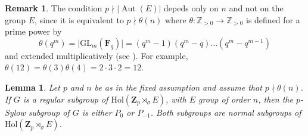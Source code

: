 \documentclass[12pt]{article}
\newtheorem{lemma}[theorem]{Lemma}
\theoremstyle{definition}
\newtheorem{remark}[theorem]{Remark}
\newcommand{\Z}{\mathbf Z}
\newcommand{\F}{\mathbf F}
\newcommand{\Hol}{\mathrm{Hol}}
\newcommand{\GL}{\mathrm{GL}}
\newcommand{\Aut}{\operatorname{Aut}}
\begin{document}
\begin{remark} The condition $p\nmid |\Aut(E)|$ depeds only on $n$ and not on the group $E$, since it is equivalent to $p\nmid \theta(n)$ where 
	$\theta\colon\mathbb{Z}_{>0}\longrightarrow\mathbb{Z}_{>0}$ is defined for a prime power by
	$$
	\theta(q^m)=\mid\GL_m(\F_q)\mid=(q^m-1)(q^m-q)\dots (q^m-q^{m-1})
	$$
	and extended multiplicatively (see \cite{BH}). For example, $\theta(12)=\theta(3)\theta(4)=2\cdot 3\cdot 2=12.$
\end{remark}

	
\begin{lemma}\label{conj}
Let $p$ and $n$ be as in the fixed assumption  and assume that $p\nmid \theta(n)$. If $G$ is a regular subgroup of $\Hol(\Z_p\rtimes_{\sigma}E)$, with $E$ group of order $n$, then the $p$-Sylow subgroup of $G$ is either $P_0$ or $P_{-1}$.
Both subgroups are normal subgroups of $\Hol(\Z_p\rtimes_{\sigma}E)$.
 \end{lemma}
\end{document}
